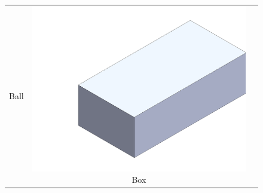 \begin{figure}[htbp]
\begin{minipage}{0.5\textwidth}
\begin{tabular}{ccc}
\begin{minipage}{0.3\linewidth}
        \scriptsize     Ball
      \end{minipage} &
      \begin{minipage}{0.3\linewidth}
        \centering
        \includegraphics[width=\linewidth]{figures/parts/Box.PNG}
        \scriptsize Box
      \end{minipage} \\


\end{tabular}
\end{minipage}
\end{figure}
